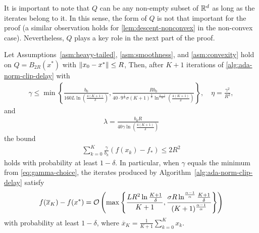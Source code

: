 \documentclass{article}
\begin{document}
\begin{remark}
    It is important to note that $Q$ can be any non-empty subset of ${\mathbb R}^d$ as long as the iterates belong to it. In this sense, the form of $Q$ is not that important for the proof (a similar observation holds for \cref{lem:descent-nonconvex} in the non-convex case). Nevertheless, $Q$ plays a key role in the next part of the proof.    
\end{remark}

\begin{theorem}
\label{thm:convex-case-conv}
    Let Assumptions~\ref{asm:heavy-tailed}, \ref{asm:smoothness}, and \ref{asm:convexity} hold on $Q = B_{2R}(x^*)$ with $\left\lVert x_0 - x^*\right\rVert \leq R$, Then, after $K+1$ iterations of \cref{alg:ada-norm-clip-delay} with
    \begin{align}
    \label{eq:gamma-choice}
        \gamma \leq \min\left\{\frac{b_0}{160L \ln\left(\frac{4(K+1)}{\delta}\right)}, \frac{R b_0}{40 \cdot 9^{\frac{1}{\alpha}}\sigma (K+1)^{\frac{1}{\alpha}} \ln^{\frac{\alpha - 1}{\alpha}}\left(\frac{4(K+1)}{\delta}\right)}\right\},\quad \eta = \frac{\gamma^2}{R^2},
    \end{align}
    and
    \begin{align}
    \label{eq:lambda-choice}
        \lambda = \frac{b_0R}{40\gamma \ln\left(\frac{4(K+1)}{\delta}\right)}
    \end{align}
    the bound 
    \begin{align*}
         \sum\limits_{k=0}^{K} \frac{\gamma}{b_k}\left(f(x_k) - f_*\right) \leq 2R^2
    \end{align*}
    holds with probability at least $1 - \delta$. In particular, when $\gamma$ equals the minimum from \eqref{eq:gamma-choice}, the iterates produced by Algorithm~\ref{alg:ada-norm-clip-delay} satisfy
    \begin{align*}
    f(\overline{x}_K) - f(x^*) = {\cal O}\left(\max\left\{\frac{LR^2 \ln\frac{K+1}{\delta}}{K+1}, \frac{\sigma R \ln^{\frac{\alpha-1}{\alpha}}\frac{K+1}{\delta}}{(K+1)^\frac{\alpha-1}{\alpha}}\right\}\right)
    \end{align*}
    with probability at least $1 - \delta$, where $\overline{x}_K = \frac{1}{K+1}\sum_{k=0}^K x_k$.
\end{theorem}
\end{document}
